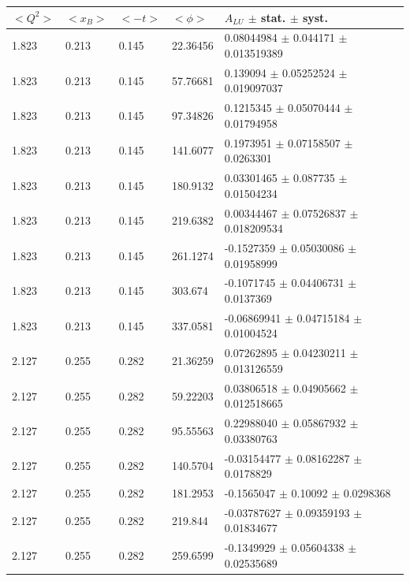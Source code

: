 \begin{table}[!h]
   \begin{center}
      \begin{tabular}{||l|l|l|l|l||}
         \hline
 $<Q^{2}>$ & $<x_{B}>$ & $<-t>$ & $<\phi>$ & $A_{LU}$ $\pm$ stat. $\pm$ syst.\\
  \hline
   1.823 & 0.213 & 0.145 &   22.36456  &   0.08044984  $\pm$  0.044171     $\pm$  0.013519389    \\
   1.823 & 0.213 & 0.145 &   57.76681  &   0.139094    $\pm$  0.05252524   $\pm$  0.019097037    \\
   1.823 & 0.213 & 0.145 &   97.34826  &   0.1215345   $\pm$  0.05070444   $\pm$  0.01794958     \\
   1.823 & 0.213 & 0.145 &   141.6077  &   0.1973951   $\pm$  0.07158507   $\pm$  0.0263301      \\
   1.823 & 0.213 & 0.145 &   180.9132  &   0.03301465  $\pm$  0.087735     $\pm$  0.01504234     \\
   1.823 & 0.213 & 0.145 &   219.6382  &   0.00344467  $\pm$  0.07526837   $\pm$  0.018209534    \\
   1.823 & 0.213 & 0.145 &   261.1274  &  -0.1527359   $\pm$  0.05030086   $\pm$  0.01958999     \\
   1.823 & 0.213 & 0.145 &   303.674   &  -0.1071745   $\pm$  0.04406731   $\pm$  0.0137369      \\
   1.823 & 0.213 & 0.145 &   337.0581  &  -0.06869941  $\pm$  0.04715184   $\pm$  0.01004524     \\
 \hline                                                                        
  2.127 & 0.255 & 0.282  &   21.36259  &  0.07262895   $\pm$ 0.04230211    $\pm$  0.013126559   \\
  2.127 & 0.255 & 0.282  &   59.22203  &  0.03806518   $\pm$ 0.04905662    $\pm$  0.012518665   \\
  2.127 & 0.255 & 0.282  &   95.55563  &  0.22988040   $\pm$ 0.05867932    $\pm$  0.03380763    \\
  2.127 & 0.255 & 0.282  &   140.5704  &  -0.03154477  $\pm$ 0.08162287    $\pm$  0.0178829     \\
  2.127 & 0.255 & 0.282  &   181.2953  &  -0.1565047   $\pm$ 0.10092       $\pm$  0.0298368     \\
  2.127 & 0.255 & 0.282  &   219.844   &  -0.03787627  $\pm$ 0.09359193    $\pm$  0.01834677    \\
  2.127 & 0.255 & 0.282  &   259.6599  &  -0.1349929   $\pm$ 0.05604338    $\pm$  0.02535689    \\

\end{tabular}
\end{center}
\end{table}
